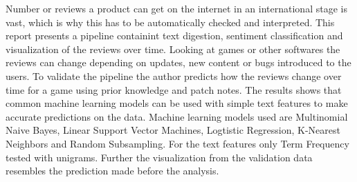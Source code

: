 Number or reviews a product can get on the internet in an international stage is vast, which is why this has to be automatically checked and interpreted. 
This report presents a pipeline containint text digestion, sentiment classification and visualization of the reviews over time. 
Looking at games or other softwares the reviews can change depending on updates, new content or bugs introduced to the users. 
To validate the pipeline the author predicts how the reviews change over time for a game using prior knowledge and patch notes. 
The results shows that common machine learning models can be used with simple text features to make accurate predictions on the data. 
Machine learning models used are Multinomial Naive Bayes, Linear Support Vector Machines, Logtistic Regression, K-Nearest Neighbors and Random Subsampling. 
For the text features only Term Frequency tested with unigrams. 
Further the visualization from the validation data resembles the prediction made before the analysis.